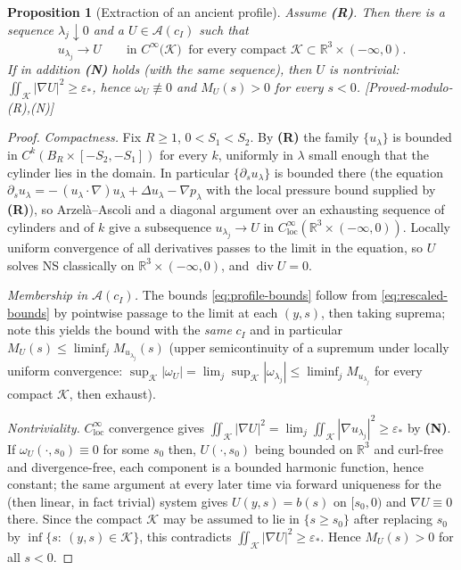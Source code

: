 \documentclass[11pt]{article}
\newtheorem{proposition}[theorem]{Proposition}
\theoremstyle{definition}
\theoremstyle{remark}
\newcommand{\R}{\mathbb{R}}
\begin{document}
\begin{proposition}[Extraction of an ancient profile]\label{prop:profile-extraction}
  Assume \textbf{(R)}. Then there is a sequence $\lambda_j\downarrow 0$ and a
  $U\in\mathcal{A}(c_I)$ such that
  \[
    u_{\lambda_j}\longrightarrow U
    \qquad\text{in } C^\infty\bigl(\mathcal{K}\bigr)\ \text{ for every compact }
    \mathcal{K}\subset\R^3\times(-\infty,0).
  \]
  If in addition \textbf{(N)} holds (with the same sequence), then $U$ is
  nontrivial: $\iint_{\mathcal{K}}|\nabla U|^2 \geq\varepsilon_*$, hence
  $\omega_U\not\equiv0$ and $M_U(s)>0$ for every $s<0$.
  \emph{[Proved-modulo-(R),(N)]}
\end{proposition}
\begin{proof}
  \emph{Compactness.} Fix $R\geq1$, $0<S_1<S_2$. By \textbf{(R)} the family
  $\{u_\lambda\}$ is bounded in $C^k(B_R\times[-S_2,-S_1])$ for every $k$,
  uniformly in $\lambda$ small enough that the cylinder lies in the domain.
  In particular $\{\partial_s u_\lambda\}$ is bounded there (the equation
  $\partial_s u_\lambda = -\,(u_\lambda\!\cdot\!\nabla)u_\lambda
  + \Delta u_\lambda - \nabla p_\lambda$ with the local pressure bound
  supplied by \textbf{(R)}), so Arzel\`a--Ascoli and a diagonal argument over
  an exhausting sequence of cylinders and of $k$ give a subsequence
  $u_{\lambda_j}\to U$ in $C^\infty_{\mathrm{loc}}(\R^3\times(-\infty,0))$.
  Locally uniform convergence of all derivatives passes to the limit in the
  equation, so $U$ solves NS classically on $\R^3\times(-\infty,0)$, and
  $\operatorname{div}U=0$.

  \emph{Membership in $\mathcal{A}(c_I)$.} The bounds
  \eqref{eq:profile-bounds} follow from \eqref{eq:rescaled-bounds} by
  pointwise passage to the limit at each $(y,s)$, then taking suprema; note
  this yields the bound with the \emph{same} $c_I$ and in particular
  $M_U(s)\leq\liminf_j M_{u_{\lambda_j}}(s)$ (upper semicontinuity of a
  supremum under locally uniform convergence: $\sup_{\mathcal{K}}|\omega_U|
  = \lim_j\sup_{\mathcal{K}}|\omega_{\lambda_j}|
  \leq\liminf_j M_{u_{\lambda_j}}$ for every compact $\mathcal{K}$, then
  exhaust).

  \emph{Nontriviality.} $C^\infty_{\mathrm{loc}}$ convergence gives
  $\iint_{\mathcal{K}}|\nabla U|^2 = \lim_j\iint_{\mathcal{K}}
  |\nabla u_{\lambda_j}|^2 \geq\varepsilon_*$ by \textbf{(N)}. If
  $\omega_U(\cdot,s_0)\equiv0$ for some $s_0$ then, $U(\cdot,s_0)$ being
  bounded on $\R^3$ and curl-free and divergence-free, each component is a
  bounded harmonic function, hence constant; the same argument at every later
  time via forward uniqueness for the (then linear, in fact trivial) system
  gives $U(y,s)=b(s)$ on $[s_0,0)$ and $\nabla U\equiv0$ there. Since the
  compact $\mathcal{K}$ may be assumed to lie in $\{s\geq s_0\}$ after
  replacing $s_0$ by $\inf\{s:\ (y,s)\in\mathcal{K}\}$, this contradicts
  $\iint_{\mathcal{K}}|\nabla U|^2\geq\varepsilon_*$. Hence
  $M_U(s)>0$ for all $s<0$.
\end{proof}
\end{document}
